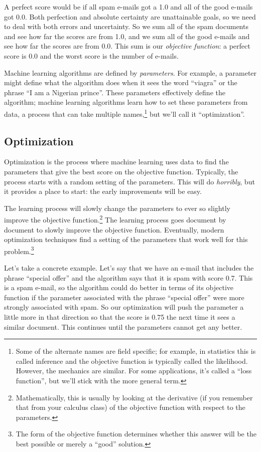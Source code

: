 A perfect score would be if all spam e-mails got a 1.0 and all of the
good e-mails got 0.0.  Both perfection and absolute certainty are
unattainable goals, so we need to deal with both errors and
uncertainty.  So we sum all of the spam documents and see how far the
scores are from 1.0, and we sum all of the good e-mails and see how
far the scores are from 0.0.  This sum is our \emph{objective
  function}: a perfect score is 0.0 and the worst score is the number
of e-mails.

Machine learning algorithms are defined by \emph{parameters}.  For
example, a parameter might define what the algorithm does when it sees
the word ``viagra'' or the phrase ``I am a Nigerian prince''.  These
parameters effectively define the algorithm; machine learning
algorithms learn how to set these parameters from data, a process that
can take multiple names,\footnote{Some of the alternate names are
  field specific; for example, in statistics this is called inference
  and the objective function is typically called the likelihood.
  However, the mechanics are similar.  For some applications, it's
  called a ``loss function'', but we'll stick with the more general
  term.} but we'll call it ``optimization''.

\subsection{Optimization}

Optimization is the process where machine learning uses data to find
the parameters that give the best score on the objective function.
Typically, the process starts with a random setting of the parameters.
This will do \emph{horribly}, but it provides a place to start: the
early improvements will be easy.

The learning process will slowly change the parameters to ever so
slightly improve the objective function.\footnote{Mathematically, this
  is usually by looking at the derivative (if you remember that from your calculus class) of the objective function with
  respect to the parameters.}  The learning process goes document by
document to slowly improve the objective function.  Eventually, modern
optimization techniques find a setting of the parameters that work
well for this problem.\footnote{The form of the objective function
  determines whether this answer will be the best possible or merely a
  ``good'' solution.}

Let's take a concrete example.  Let's say that we have an e-mail that
includes the phrase ``special offer'' and the algorithm says that it
is spam with score 0.7.  This is a spam e-mail, so the algorithm could
do better in terms of its objective function if the parameter
associated with the phrase ``special offer'' were more strongly
associated with spam.  So our optimization will push the parameter a
little more in that direction so that the score is 0.75 the next time
it sees a similar document.  This continues until the parameters
cannot get any better.

